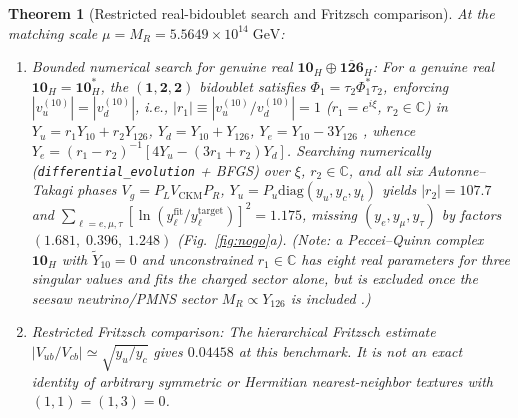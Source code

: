 \documentclass[11pt,a4paper]{article}
\newtheorem{theorem}{Theorem}[section]
\begin{document}
\begin{theorem}[Restricted real-bidoublet search and Fritzsch comparison]
\label{thm:spin10-nni-nogo}
At the matching scale $\mu = M_R = 5.5649\times 10^{14}\;\mathrm{GeV}$:
\begin{enumerate}[label=(\roman*),leftmargin=1.8em,itemsep=2pt]
\item \emph{Bounded numerical search for genuine real $\mathbf{10}_H \oplus \overline{\mathbf{126}}_H$:} For a genuine real $\mathbf{10}_H = \mathbf{10}_H^*$, the $(\mathbf{1},\mathbf{2},\mathbf{2})$ bidoublet satisfies $\Phi_1 = \tau_2 \Phi_1^* \tau_2$, enforcing $|v_u^{(10)}| = |v_d^{(10)}|$, i.e., $|r_1| \equiv |v_u^{(10)}/v_d^{(10)}| = 1$ ($r_1 = e^{i\xi}$, $r_2 \in \mathbb{C}$) in $Y_u = r_1 Y_{10} + r_2 Y_{126}$, $Y_d = Y_{10} + Y_{126}$, $Y_e = Y_{10} - 3Y_{126}$ \cite{BajcSenjanovicVissani2006}, whence $Y_e = (r_1 - r_2)^{-1}[4Y_u - (3r_1 + r_2)Y_d]$. Searching numerically (\texttt{differential\_evolution} + BFGS) over $\xi$, $r_2 \in \mathbb{C}$, and all six Autonne--Takagi phases $V_g = P_L V_{\mathrm{CKM}} P_R$, $Y_u = P_u \mathrm{diag}(y_u, y_c, y_t)$ yields $|r_2| = 107.7$ and $\sum_{\ell=e,\mu,\tau}[\ln(y_\ell^{\mathrm{fit}}/y_\ell^{\mathrm{target}})]^2 = 1.175$, missing $(y_e, y_\mu, y_\tau)$ by factors $(1.681,\; 0.396,\; 1.248)$ (Fig.~\ref{fig:nogo}a). (Note: a Peccei--Quinn complex $\mathbf{10}_H$ with $\tilde{Y}_{10} = 0$ and unconstrained $r_1 \in \mathbb{C}$ has eight real parameters for three singular values and fits the charged sector alone, but is excluded once the seesaw neutrino/PMNS sector $M_R \propto Y_{126}$ is included \cite{BajcSenjanovicVissani2006,DueckRodejohann2013}.)
\item \emph{Restricted Fritzsch comparison:} The hierarchical Fritzsch estimate $|V_{ub}/V_{cb}|\simeq\sqrt{y_u/y_c}$ gives $0.04458$ at this benchmark. It is not an exact identity of arbitrary symmetric or Hermitian nearest-neighbor textures with $(1,1)=(1,3)=0$.
\end{enumerate}
\end{theorem}
\end{document}
